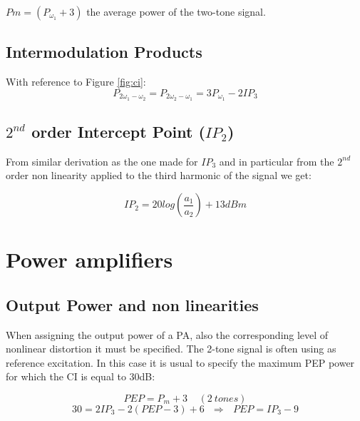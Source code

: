  $Pm =(P_{\omega_1}+3)$ the average power of the two-tone signal.

\subsection{Intermodulation Products} %
\label{sub:intermodulation_products}

With reference to Figure \ref{fig:ci}:
\begin{equation}
	P_{2\omega_{1}-\omega_{2}}=P_{2\omega_{2}-\omega_{1}}=3P_{\omega_1}-2IP_3
\end{equation}


\subsection{$2^{nd}$ order Intercept Point ($IP_2$)} %
\label{sub:2_}

From similar derivation as the one made for $IP_3$ and in particular from the $2^{nd}$ order non linearity applied to the third harmonic of the signal we get:

\begin{equation}
	IP_2= 20log\left(\frac{a_1}{a_2}\right)+13dBm
\end{equation}

\section{Power amplifiers} %
\label{sec:power_amplifiers}


\subsection{Output Power and non linearities} %
\label{sub:output_power_and_non_linearities}

When assigning the output power of a PA, also the corresponding level of
nonlinear distortion it must be specified.
The 2-tone signal is often using as reference excitation. In this case it is
usual to specify the maximum PEP power for which the CI is equal to 30dB:


\begin{equation}
	\label{eq:pep}
	PEP = P_m +3  \ \ \ \ \ (2 \ tones) 
	\end{equation}
\begin{equation}
	30= 2IP_3-2(PEP-3)+6 \ \ \ \Longrightarrow \ \ \ PEP= IP_3-9 
\end{equation}


